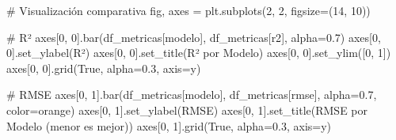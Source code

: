 \documentclass[
  doc,
  floatsintext,
  longtable,
  a4paper,
  nolmodern,
  notxfonts,
  notimes,
  12pt,
  colorlinks=true,linkcolor=blue,citecolor=blue,urlcolor=blue]{apa7}
\newenvironment{Shaded}{\begin{snugshade}}{\end{snugshade}}
\newcommand{\CommentTok}[1]{\textcolor[rgb]{0.37,0.37,0.37}{#1}}
\newcommand{\DecValTok}[1]{\textcolor[rgb]{0.68,0.00,0.00}{#1}}
\newcommand{\FloatTok}[1]{\textcolor[rgb]{0.68,0.00,0.00}{#1}}
\newcommand{\NormalTok}[1]{\textcolor[rgb]{0.00,0.23,0.31}{#1}}
\newcommand{\OperatorTok}[1]{\textcolor[rgb]{0.37,0.37,0.37}{#1}}
\newcommand{\StringTok}[1]{\textcolor[rgb]{0.13,0.47,0.30}{#1}}
\newcommand{\VariableTok}[1]{\textcolor[rgb]{0.07,0.07,0.07}{#1}}
\begin{document}
\begin{Shaded}
\begin{Highlighting}[]
\CommentTok{\# Visualización comparativa}
\NormalTok{fig, axes }\OperatorTok{=}\NormalTok{ plt.subplots(}\DecValTok{2}\NormalTok{, }\DecValTok{2}\NormalTok{, figsize}\OperatorTok{=}\NormalTok{(}\DecValTok{14}\NormalTok{, }\DecValTok{10}\NormalTok{))}

\CommentTok{\# R²}
\NormalTok{axes[}\DecValTok{0}\NormalTok{, }\DecValTok{0}\NormalTok{].bar(df\_metricas[}\StringTok{\textquotesingle{}modelo\textquotesingle{}}\NormalTok{], df\_metricas[}\StringTok{\textquotesingle{}r2\textquotesingle{}}\NormalTok{], alpha}\OperatorTok{=}\FloatTok{0.7}\NormalTok{)}
\NormalTok{axes[}\DecValTok{0}\NormalTok{, }\DecValTok{0}\NormalTok{].set\_ylabel(}\StringTok{\textquotesingle{}R²\textquotesingle{}}\NormalTok{)}
\NormalTok{axes[}\DecValTok{0}\NormalTok{, }\DecValTok{0}\NormalTok{].set\_title(}\StringTok{\textquotesingle{}R² por Modelo\textquotesingle{}}\NormalTok{)}
\NormalTok{axes[}\DecValTok{0}\NormalTok{, }\DecValTok{0}\NormalTok{].set\_ylim([}\DecValTok{0}\NormalTok{, }\DecValTok{1}\NormalTok{])}
\NormalTok{axes[}\DecValTok{0}\NormalTok{, }\DecValTok{0}\NormalTok{].grid(}\VariableTok{True}\NormalTok{, alpha}\OperatorTok{=}\FloatTok{0.3}\NormalTok{, axis}\OperatorTok{=}\StringTok{\textquotesingle{}y\textquotesingle{}}\NormalTok{)}

\CommentTok{\# RMSE}
\NormalTok{axes[}\DecValTok{0}\NormalTok{, }\DecValTok{1}\NormalTok{].bar(df\_metricas[}\StringTok{\textquotesingle{}modelo\textquotesingle{}}\NormalTok{], df\_metricas[}\StringTok{\textquotesingle{}rmse\textquotesingle{}}\NormalTok{], }
\NormalTok{              alpha}\OperatorTok{=}\FloatTok{0.7}\NormalTok{, color}\OperatorTok{=}\StringTok{\textquotesingle{}orange\textquotesingle{}}\NormalTok{)}
\NormalTok{axes[}\DecValTok{0}\NormalTok{, }\DecValTok{1}\NormalTok{].set\_ylabel(}\StringTok{\textquotesingle{}RMSE\textquotesingle{}}\NormalTok{)}
\NormalTok{axes[}\DecValTok{0}\NormalTok{, }\DecValTok{1}\NormalTok{].set\_title(}\StringTok{\textquotesingle{}RMSE por Modelo (menor es mejor)\textquotesingle{}}\NormalTok{)}
\NormalTok{axes[}\DecValTok{0}\NormalTok{, }\DecValTok{1}\NormalTok{].grid(}\VariableTok{True}\NormalTok{, alpha}\OperatorTok{=}\FloatTok{0.3}\NormalTok{, axis}\OperatorTok{=}\StringTok{\textquotesingle{}y\textquotesingle{}}\NormalTok{)}


\end{Highlighting}
\end{Shaded}
\end{document}
